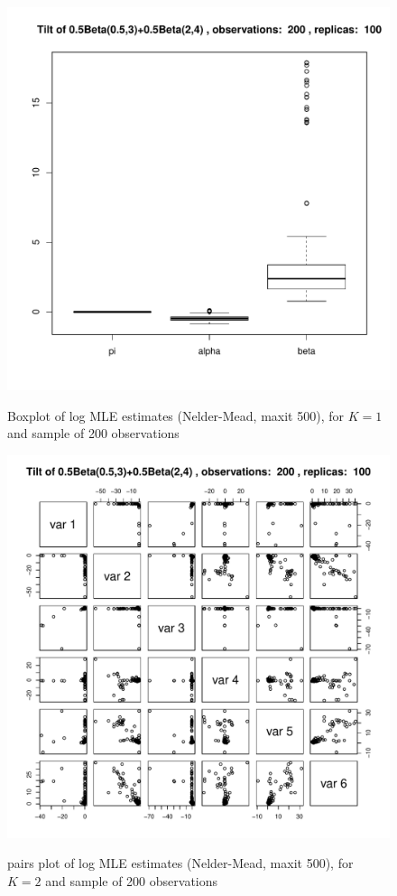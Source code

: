 \documentclass[10pt]{report}
\begin{document}
\begin{figure}[h]
\centering
\includegraphics[width=\textwidth]{../img/p05_a05_b3_p05_a2_b4/tilted/K1/bxplots/n200_R100.pdf}
\label{fig:TBD6}
\caption{Boxplot of log MLE estimates (Nelder-Mead, maxit 500), for $K=1$ and sample of 200 observations}
\end{figure}

\begin{figure}[h]
\centering
\includegraphics[width=\textwidth]{../img/p05_a05_b3_p05_a2_b4/tilted/K2/pairs/n200_R100.pdf}
\label{fig:TBD7}
\caption{pairs plot of log MLE estimates (Nelder-Mead, maxit 500), for $K=2$ and sample of 200 observations}
\end{figure}
\end{document}
